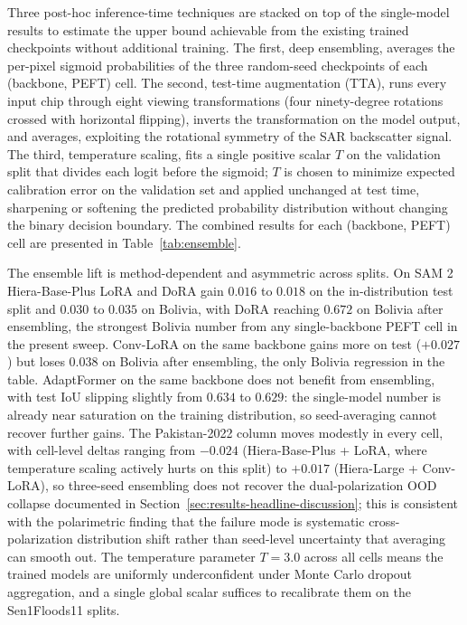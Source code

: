\documentclass[11pt,a4paper,oneside]{report}
\newcommand{\maxwidthtable}[1]{%
  \resizebox{\ifdim\width>\linewidth \linewidth\else \width\fi}{!}{#1}%
}
\begin{document}
Three post-hoc inference-time techniques are stacked on top of the single-model results to estimate the upper bound achievable from the existing trained checkpoints without additional training. The first, deep ensembling, averages the per-pixel sigmoid probabilities of the three random-seed checkpoints of each (backbone, PEFT) cell. The second, test-time augmentation (TTA), runs every input chip through eight viewing transformations (four ninety-degree rotations crossed with horizontal flipping), inverts the transformation on the model output, and averages, exploiting the rotational symmetry of the SAR backscatter signal. The third, temperature scaling, fits a single positive scalar $T$ on the validation split that divides each logit before the sigmoid; $T$ is chosen to minimize expected calibration error on the validation set and applied unchanged at test time, sharpening or softening the predicted probability distribution without changing the binary decision boundary. The combined results for each (backbone, PEFT) cell are presented in Table~\ref{tab:ensemble}.

\begin{table}[H]
\centering
\caption{Deep ensemble + TTA + temperature-scaled IoU and ECE for each (backbone, PEFT) cell, evaluated on all four splits. Comparison to the single-model best-val-IoU columns of Table~\ref{tab:results_main} quantifies the headroom obtainable from inference-time techniques on top of the existing checkpoints.}
\label{tab:ensemble}
\maxwidthtable{%
\IfFileExists{figs/ensemble_table.tex}{}{\textit{Table pending sweep completion.}}%
}
\end{table}

The ensemble lift is method-dependent and asymmetric across splits. On SAM 2 Hiera-Base-Plus LoRA and DoRA gain $0.016$ to $0.018$ on the in-distribution test split and $0.030$ to $0.035$ on Bolivia, with DoRA reaching $0.672$ on Bolivia after ensembling, the strongest Bolivia number from any single-backbone PEFT cell in the present sweep. Conv-LoRA on the same backbone gains more on test ($+0.027$) but loses $0.038$ on Bolivia after ensembling, the only Bolivia regression in the table. AdaptFormer on the same backbone does not benefit from ensembling, with test IoU slipping slightly from $0.634$ to $0.629$: the single-model number is already near saturation on the training distribution, so seed-averaging cannot recover further gains. The Pakistan-2022 column moves modestly in every cell, with cell-level deltas ranging from $-0.024$ (Hiera-Base-Plus + LoRA, where temperature scaling actively hurts on this split) to $+0.017$ (Hiera-Large + Conv-LoRA), so three-seed ensembling does not recover the dual-polarization OOD collapse documented in Section~\ref{sec:results-headline-discussion}; this is consistent with the polarimetric finding that the failure mode is systematic cross-polarization distribution shift rather than seed-level uncertainty that averaging can smooth out. The temperature parameter $T = 3.0$ across all cells means the trained models are uniformly underconfident under Monte Carlo dropout aggregation, and a single global scalar suffices to recalibrate them on the Sen1Floods11 splits.
\end{document}
